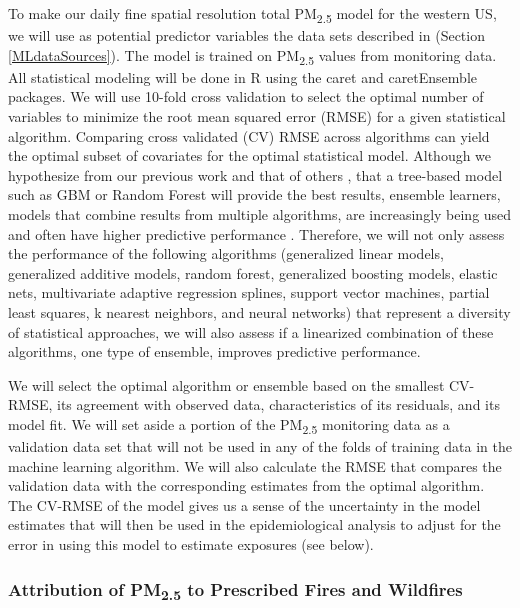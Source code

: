 \documentclass[authoryear]{elsarticle}
\begin{document}
To make our daily fine spatial resolution total PM\textsubscript{2.5} model for the western US, we will use as potential predictor variables the data sets described in  (Section \ref{MLdataSources}). %
The model is trained on PM\textsubscript{2.5} values from monitoring data. 
All statistical modeling will be done in R \citep{Rproject2017} using the caret \citep{Rcaret2017} and caretEnsemble \citep{RcaretEnsemble2017} packages. We will use 10-fold cross validation to select the optimal number of variables to minimize the root mean squared error (RMSE) for a given statistical algorithm. Comparing cross validated (CV) RMSE across algorithms can yield the optimal subset of covariates for the optimal statistical model. Although we hypothesize from our previous work and that of others \citep{Reid2015,BrokampExposure2017,PandeyPredicting2013}, that a tree-based model such as GBM or Random Forest will provide the best results, ensemble learners, models that combine results from multiple algorithms, are increasingly being used and often have higher predictive performance \citep{DaviesOptimal2016}. Therefore, we will not only assess the performance of the following algorithms (generalized linear models, generalized additive models, random forest, generalized boosting models, elastic nets, multivariate adaptive regression splines, support vector machines, partial least squares, k nearest neighbors, and neural networks) that represent a diversity of statistical approaches, we will also assess if a linearized combination of these algorithms, one type of ensemble, improves predictive performance.

We will select the optimal algorithm or ensemble based on the smallest CV-RMSE, its agreement with observed data, characteristics of its residuals, and its model fit. 
We will set aside a portion of the PM\textsubscript{2.5} monitoring data as a validation data set that will not be used in any of the folds of training data in the machine learning algorithm. We will also calculate the RMSE that compares the validation data with the corresponding estimates from the optimal algorithm. The CV-RMSE of the model gives us a sense of the uncertainty in the model estimates that will then be used in the epidemiological analysis to adjust for the error in using this model to estimate exposures (see below).

\subsubsection{Attribution of \texorpdfstring{PM\textsubscript{2.5}}{} to Prescribed Fires and Wildfires}
\end{document}
